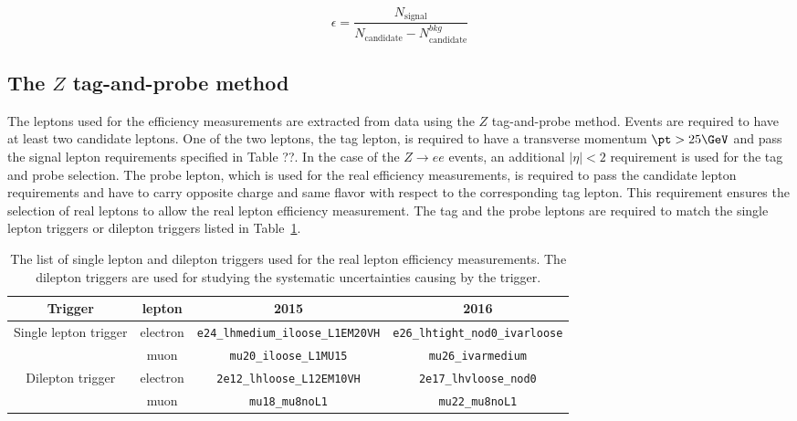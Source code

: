 \begin{equation}
\epsilon = \frac{N_{\mathrm{signal}}}{N_{\mathrm{candidate}} - N_{\mathrm{candidate}}^{bkg}}
\label{eq:RLE_efficiency_formula}
\end{equation}

\subsection{The $Z$ tag-and-probe method}
\label{subsubsec:RLE_ZTandP_method}

The leptons used for the efficiency measurements are extracted from data using the $Z$ tag-and-probe method.
Events are required to have at least two candidate leptons.
One of the two leptons, the tag lepton, is required to have a transverse momentum $\pt>25 \GeV$ and pass the signal lepton requirements
specified in Table ??.
In the case of the $Z\to ee$ events, an additional $|\eta|<2$ requirement is used for the tag and probe selection.
The probe lepton, which is used for the real efficiency measurements, is required to pass the candidate lepton requirements and have to 
carry opposite charge and same flavor with respect to the corresponding tag lepton. This requirement ensures the selection of 
real leptons to allow the real lepton efficiency measurement.
The tag and the probe leptons are required to match the single lepton triggers or dilepton triggers listed in 
Table~\ref{tab:RLE_single_lepton_triggers}.

\begin{table}[htbp]
\begin{center}
\begin{tabular}{cccc}
\hline
\hline
Trigger & lepton & 2015 & 2016\\
\hline
\multirow{2}{*}{Single lepton trigger} & electron & \texttt{e24\_lhmedium\_iloose\_L1EM20VH} & \texttt{e26\_lhtight\_nod0\_ivarloose}\\
& muon & \texttt{mu20\_iloose\_L1MU15} & \texttt{mu26\_ivarmedium}\\
\hline
\multirow{2}{*}{Dilepton trigger} & electron & \texttt{2e12\_lhloose\_L12EM10VH} & \texttt{2e17\_lhvloose\_nod0}\\
& muon & \texttt{mu18\_mu8noL1} & \texttt{mu22\_mu8noL1}\\
\hline
\hline
\end{tabular}
\end{center}
\caption{The list of single lepton and dilepton triggers used for the real lepton efficiency measurements.
The dilepton triggers are used for studying the systematic uncertainties causing by the trigger.}
\label{tab:RLE_single_lepton_triggers}
\end{table}

